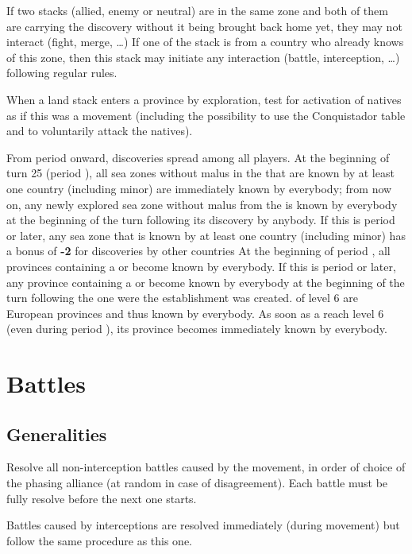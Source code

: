 If two stacks (allied, enemy or neutral) are in the same zone and both of them
are carrying the discovery without it being brought back home yet, they may
not interact (fight, merge, \ldots) If one of the stack is from a country who
already knows of this zone, then this stack may initiate any interaction
(battle, interception, \ldots) following regular rules.

When a land stack enters a province by exploration, test for activation of
natives as if this was a movement (including the possibility to use the
Conquistador table and to voluntarily attack the natives).

\bparag From period  onward, discoveries spread among all players.
\bparag[Atlantic] At the beginning of turn 25 (period ), all sea
zones without malus in the  that are known by at least one
country (including minor) are immediately known by everybody; from now on, any
newly explored sea zone without malus from the  is known by
everybody at the beginning of the turn following its discovery by anybody.
\bparag[On sea] If this is period  or later, any sea zone that is
known by at least one country (including minor) has a bonus of {\bf -2} for
discoveries by other countries
\bparag [On land] At the beginning of period , all provinces
containing a \COL or \TP become known by everybody.
\bparag [On land] If this is period  or later, any province
containing a \COL or \TP become known by everybody at the beginning of the
turn following the one were the establishment was created.
\bparag[Level 6] \COL of level 6 are European provinces and thus known by
everybody. As soon as a \COL reach level 6 (even during period ),
its province becomes immediately known by everybody.

\section{Battles}
\label{chMilitary:Battles}
\subsection{Generalities}
Resolve all non-interception battles caused by the movement, in order of
choice of the phasing alliance (at random in case of disagreement). Each
battle must be fully resolve before the next one starts.

Battles caused by interceptions are resolved immediately (during movement) but
follow the same procedure as this one.

